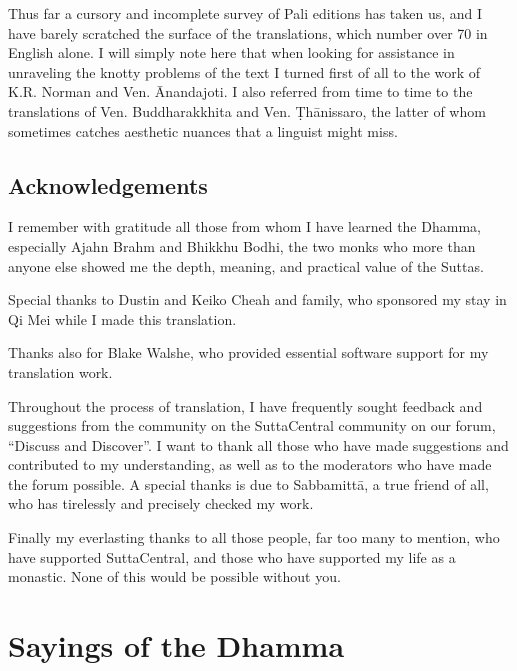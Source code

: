\documentclass[12pt,openany]{book}%
\let\oldcontentsline\contentsline
\newcommand{\nopagecontentsline}[3]{\oldcontentsline{#1}{#2}{}}
\let\oldmainmatter\mainmatter
\renewcommand{\mainmatter}{%
\chapterfont{\setstretch{.85}\normalfont\centering\Large}%
\sectionfont{\setstretch{.85}\Semiboldsubheadfont}%
\oldmainmatter}
\begin{document}
Thus far a cursory and incomplete survey of Pali editions has taken us, and I have barely scratched the surface of the translations, which number over 70 in English alone. I will simply note here that when looking for assistance in unraveling the knotty problems of the text I turned first of all to the work of K.R. Norman and Ven. Ānandajoti. I also referred from time to time to the translations of Ven. Buddharakkhita and Ven. \textsanskrit{Ṭhānissaro}, the latter of whom sometimes catches aesthetic nuances that a linguist might miss.

%
\chapter*{Acknowledgements}

I remember with gratitude all those from whom I have learned the Dhamma, especially Ajahn Brahm and Bhikkhu Bodhi, the two monks who more than anyone else showed me the depth, meaning, and practical value of the Suttas.

Special thanks to Dustin and Keiko Cheah and family, who sponsored my stay in Qi Mei while I made this translation.

Thanks also for Blake Walshe, who provided essential software support for my translation work.

Throughout the process of translation, I have frequently sought feedback and suggestions from the community on the SuttaCentral community on our forum, “Discuss and Discover”. I want to thank all those who have made suggestions and contributed to my understanding, as well as to the moderators who have made the forum possible. A special thanks is due to \textsanskrit{Sabbamittā}, a true friend of all, who has tirelessly and precisely checked my work.

Finally my everlasting thanks to all those people, far too many to mention, who have supported SuttaCentral, and those who have supported my life as a monastic. None of this would be possible without you.

%
\mainmatter%
\pagestyle{fancy}%
\part*{Sayings of the Dhamma}
\markboth{}{}
\addtocontents{toc}{\let\protect\contentsline\protect\oldcontentsline}
\end{document}
